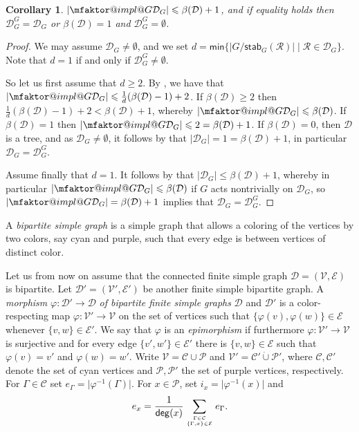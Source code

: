 \documentclass[a4paper,12pt,reqno]{amsart}
\makeatletter
\newcommand\mc\mathcal
\newtheorem{cor}[thm]{Corollary}
\theoremstyle{definition}
\numberwithin{equation}{thm}
\renewcommand{\leq}{\leqslant}
\renewcommand{\geq}{\geqslant}
\renewcommand{\deg}{\mathsf{deg}}
\DeclareRobustCommand*{\mfaktor}[3][]
{
   { \mathpalette{\mfaktor@impl@}{{#1}{#2}{#3}} }
}
\newcommand*{\mfaktor@impl@}[2]{\mfaktor@impl#1#2}
\newcommand*{\mfaktor@impl}[4]{
   \settoheight{\faktor@zaehlerhoehe}{\ensuremath{#1#2{#3}}}%
   \settoheight{\faktor@nennerhoehe}{\ensuremath{#1#2{#4}}}%
      \raisebox{-0.5\faktor@zaehlerhoehe}{\ensuremath{#1#2{#3}}}%
      \mkern-4mu\diagdown\mkern-5mu%
      \raisebox{0.5\faktor@nennerhoehe}{\ensuremath{#1#2{#4}}}%
}
\makeatother
\begin{document}
\begin{cor}\label{border-line vorteces are rational}
 $\left\vert \mfaktor{G}{\mc{D}_G} \right\vert \leq \beta(\mc{D})+1$, and
if equality holds  then $ \mc{D}^G_G={\mc{D}_G}$ or  $\beta(\mc{D})=1$ and $\mc{D}^G_G = \emptyset$.
\end{cor}
\begin{proof}
We may assume $\mathcal{D}_{G} \neq \emptyset $, and we set
$d=\mathsf{min}\{|G/\mathsf{stab}_G(\mathcal{R})|\mid \mathcal{R}\in \mathcal{D}_{G}\}$. Note that $d=1$ if and only if
$\mathcal{D}_{G}^{G} \neq \emptyset$.

So let us first assume that $d\geq 2$. 
By , we have that $\vert \mfaktor{G}{\mc{D}_G}\vert  \leq \frac{1}d(\beta(\mc{D})-1)+2$.
If $\beta(\mc{D})\geq 2$  then $\frac{1}{d}(\beta(\mc{D})-1)+2<\beta(\mc{D})+1$, whereby $\vert \mfaktor{G}{\mc{D}_G}\vert \leq \beta(\mc{D})$.
If $\beta(\mc{D})=1$  then $\vert \mfaktor{G}{\mc{D}_G}\vert \leq 2=\beta(\mc{D})+1$.
If $\beta(\mc{D})=0$, then $\mc{D}$ is a tree, and as $\mc{D}_G\neq\emptyset$, it follows by  that $|\mc{D}_G|=1=\beta(\mc{D})+1$,  in particular  $\mc{D}_G =\mc{D}_G^G$.

Assume finally that $d= 1$. It follows by  that $|\mc{D}_G|\leq \beta(\mc{D}) + 1$, whereby in particular $\vert \mfaktor{G}{\mc{D}_G}\vert \leq \beta(\mc{D})$ if $G$ acts nontrivially on $\mc{D}_G$, so  $\vert \mfaktor{G}{\mc{D}_G}\vert = \beta(\mc{D}) + 1$  implies that $\mc{D}_G=\mc{D}_G^G$. 
\end{proof}

A \textit{bipartite simple graph} is a simple graph that allows a coloring of the vertices by two colors, say cyan and purple, such that every edge is between  vertices of distinct color.

Let us from now on assume that the connected finite simple graph $\mc{D}=(\mathcal{V},\mathcal{E})$ is bipartite. 
Let $\mc{D}'=(\mathcal{V}',\mathcal{E}')$ be another finite simple bipartite graph.
 A \textit{morphism} $\varphi: \mc{D}' \to \mc{D}$ \textit{of bipartite finite simple graphs} $\mathcal{D}$ and $\mathcal{D}'$ is a color-respecting map $\varphi:\mathcal{V}' \to \mathcal{V}$ on the set of vertices such that $\{\varphi(v),\varphi(w)\}\in \mathcal{E}$ whenever $\{v,w \}\in \mathcal{E}'$.
 We say that $\varphi$ is an \textit{epimorphism} if furthermore $\varphi: \mc{V}' \to \mc{V}$ is surjective and for every edge $\{v',w'\} \in \mc{E}'$ there is $\{v,w\} \in \mathcal{E}$ such that $\varphi(v)=v'$ and $\varphi(w)=w'$.
 Write $\mathcal{V}= \mathcal{C} \cup \mathcal{P}$ and $\mathcal{V}'= \mathcal{C}' \dot{\cup} \mathcal{P}'$, where $\mathcal{C}, \mathcal{C}' $ denote the set of cyan vertices and $\mathcal{P},\mathcal{P}'$ the set of purple vertices, respectively.
For $\Gamma \in \mc{C}$ set $e_\Gamma= \vert \varphi^{-1}(\Gamma)\vert$. 
For $x \in \mc{P}$, set $i_x=\vert \varphi^{-1}(x)\vert$ and $$e_x=\frac{1}{\deg(x)} \sum_{\Gamma \in \mc{C} \atop \{\Gamma,x\} \in \mathcal{E}} e_\Gamma.$$
\end{document}
